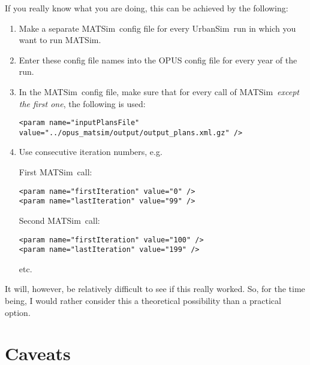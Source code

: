 \documentclass{article}
\def\matsim{MATSim}
\def\urbansim{UrbanSim}
\begin{document}
If you really know what you are doing, this can be achieved by the
following:
\begin{enumerate}

\item Make a separate \matsim\ config file for every \urbansim\ run in
which you want to run \matsim.

\item Enter these config file names into the OPUS config file for
every year of the run.

\item In the \matsim\ config file, make sure that for every call of
\matsim\ \emph{except the first one}, the following is used:
{\footnotesize
\begin{verbatim}
<param name="inputPlansFile" value="../opus_matsim/output/output_plans.xml.gz" />
\end{verbatim}
}

\item Use consecutive iteration numbers, e.g.

First \matsim\ call:
\begin{verbatim}
<param name="firstIteration" value="0" />
<param name="lastIteration" value="99" />
\end{verbatim}

Second \matsim\ call:
\begin{verbatim}
<param name="firstIteration" value="100" />
<param name="lastIteration" value="199" />
\end{verbatim}

etc.

\end{enumerate}

It will, however, be relatively difficult to see if this really
worked.  So, for the time being, I would rather consider this a
theoretical possibility than a practical option.

\section{Caveats}
\end{document}
